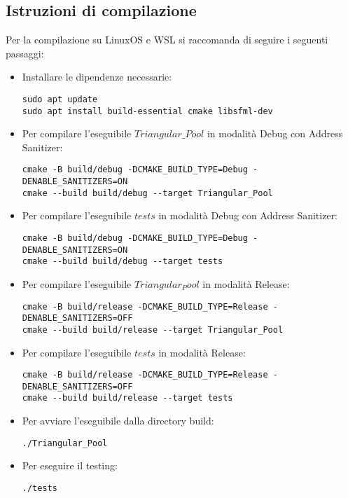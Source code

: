 \documentclass{article}
\begin{document}
\subsection{Istruzioni di compilazione}
Per la compilazione su LinuxOS e WSL si raccomanda di seguire i seguenti passaggi:


\begin{itemize}
    \item Installare le dipendenze necessarie:
    \begin{lstlisting}[style=wsl]
sudo apt update
sudo apt install build-essential cmake libsfml-dev
\end{lstlisting}

\item Per compilare l'eseguibile $Triangular\_Pool$ in modalità Debug con Address Sanitizer:
    \begin{lstlisting}[style=wsl]
cmake -B build/debug -DCMAKE_BUILD_TYPE=Debug -DENABLE_SANITIZERS=ON
cmake --build build/debug --target Triangular_Pool
\end{lstlisting}

\item Per compilare l'eseguibile $tests$ in modalità Debug con Address Sanitizer:
    \begin{lstlisting}[style=wsl]
cmake -B build/debug -DCMAKE_BUILD_TYPE=Debug -DENABLE_SANITIZERS=ON
cmake --build build/debug --target tests
\end{lstlisting}

\item Per compilare l'eseguibile $Triangular_Pool$ in modalità Release:
    \begin{lstlisting}[style=wsl]
cmake -B build/release -DCMAKE_BUILD_TYPE=Release -DENABLE_SANITIZERS=OFF
cmake --build build/release --target Triangular_Pool
\end{lstlisting}


\item Per compilare l'eseguibile $tests$ in modalità Release:
    \begin{lstlisting}[style=wsl]
cmake -B build/release -DCMAKE_BUILD_TYPE=Release -DENABLE_SANITIZERS=OFF
cmake --build build/release --target tests
\end{lstlisting}




\item Per avviare l'eseguibile dalla directory build:
    \begin{lstlisting}[style=wsl]
./Triangular_Pool
\end{lstlisting}

\item Per eseguire il testing:
    \begin{lstlisting}[style=wsl]
./tests
\end{lstlisting}

\end{itemize}
\end{document}
